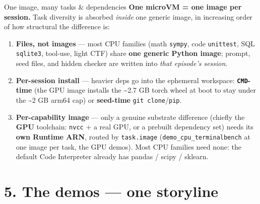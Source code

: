 \documentclass[
  10pt,
  ignorenonframetext,
  aspectratio=169,
  t]{beamer}
\providecommand{\tightlist}{%
  \setlength{\itemsep}{0pt}\setlength{\parskip}{0pt}}
\begin{document}
\begin{frame}{One image, many tasks \& dependencies}
\protect\hypertarget{one-image-many-tasks-dependencies}{}
\textbf{One microVM = one image per session.} Task diversity is absorbed
\emph{inside} one generic image, in increasing order of how structural
the difference is:

\begin{enumerate}
\tightlist
\item
  \textbf{Files, not images} --- most CPU families (math \texttt{sympy},
  code \texttt{unittest}, SQL \texttt{sqlite3}, tool-use, light CTF)
  share \textbf{one generic Python image}; prompt, seed files, and
  hidden checker are written into \emph{that episode's session}.
\item
  \textbf{Per-session install} --- heavier deps go into the ephemeral
  workspace: \textbf{\texttt{CMD}-time} (the GPU image installs the
  \textasciitilde2.7 GB torch wheel at boot to stay under the
  \textasciitilde2 GB arm64 cap) or \textbf{seed-time}
  \texttt{git\ clone}/\texttt{pip}.
\item
  \textbf{Per-capability image} --- only a genuine substrate difference
  (chiefly the \textbf{GPU} toolchain: \texttt{nvcc} + a real GPU, or a
  prebuilt dependency set) needs its \textbf{own Runtime ARN}, routed by
  \texttt{task.image} (\texttt{demo\_cpu\_terminalbench} at one image
  per task, the GPU demos). Most CPU families need none: the default
  Code Interpreter already has pandas / scipy / sklearn.
\end{enumerate}
\end{frame}

\hypertarget{the-demos-one-storyline}{%
\section{5. The demos --- one storyline}\label{the-demos-one-storyline}}
\end{document}
